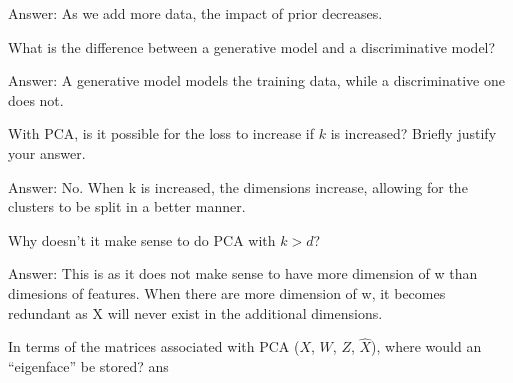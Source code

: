 \documentclass{article}
\def\ans#1{\par\gre{Answer: #1}}
\def\gre#1{{\color{gre}#1}}
\begin{document}
{\ans{As we add more data, the impact of prior decreases.}
\item What is the difference between a generative model and a discriminative model?
\ans{A generative model models the training data, while a discriminative one does not.}
\item With PCA, is it possible for the loss to increase if $k$ is increased? Briefly justify your answer.
\ans{No. When k is increased, the dimensions increase, allowing for the clusters to be split in a better manner.}
\item Why doesn't it make sense to do PCA with $k > d$?
\ans{This is as it does not make sense to have more dimension of w than dimesions of features. When there are more dimension of w, it becomes redundant as X will never exist in the additional dimensions.}
\item In terms of the matrices associated with PCA ($X$, $W$, $Z$, $\hat{X}$), where would an ``eigenface'' be stored?
ans{}
}
\end{document}
